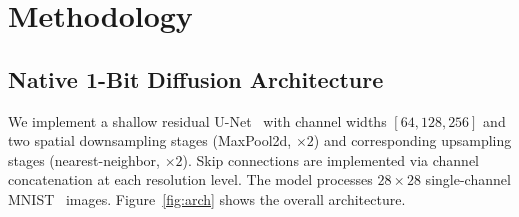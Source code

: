 \documentclass[conference]{IEEEtran}
\begin{document}
\section{Methodology}

\subsection{Native 1-Bit Diffusion Architecture}

We implement a shallow residual U-Net~\cite{ronneberger2015unet} with channel widths
$[64, 128, 256]$ and two spatial downsampling stages (MaxPool2d, $\times2$) and
corresponding upsampling stages (nearest-neighbor, $\times2$). Skip connections are
implemented via channel concatenation at each resolution level. The model processes
$28{\times}28$ single-channel MNIST~\cite{lecun1998mnist} images.
Figure~\ref{fig:arch} shows the overall architecture.
\end{document}
